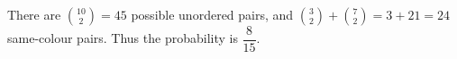 There are $\binom{10}{2}=45$ possible unordered pairs, and $\binom32+\binom72=3+21=24$ same-colour pairs. Thus the probability is $\boxed{\dfrac{8}{15}}$.
